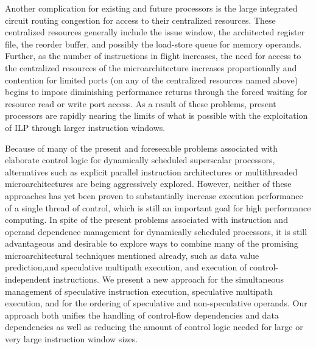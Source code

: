 \documentclass[10pt,dvips]{article}
\begin{document}
Another complication for existing and future processors is the large
integrated circuit routing congestion for 
access to their centralized resources.
These centralized resources generally include the issue window,
the architected register file, the reorder buffer, and possibly
the load-store queue for memory operands.
Further, as the number of instructions in flight increases, the need
for access to the centralized resources of the microarchitecture
increases proportionally and contention for limited ports (on any
of the centralized resources named above) begins to impose diminishing
performance returns through the forced waiting for resource 
read or write port access.
As a result of these problems, present processors
are rapidly nearing the limits of what is possible with the exploitation
of ILP through larger instruction windows.

Because of many of the present and foreseeable problems associated
with elaborate control logic for dynamically scheduled superscalar processors,
alternatives such as explicit parallel instruction architectures
or multithreaded microarchitectures are being aggressively explored.
However, neither of these approaches has yet been proven to substantially
increase
execution performance of a single thread of control, which is still
an important goal for high performance computing.
In spite of the present problems associated with instruction and operand
dependence management for dynamically scheduled processors, 
it is still advantageous and desirable
to explore ways to combine many of the promising microarchitectural
techniques mentioned already, such as data value prediction,and speculative
multipath execution, and execution of control-independent instructions.
We present a new approach for the simultaneous management of speculative
instruction execution, speculative multipath execution, and for
the ordering of speculative and non-speculative operands.
Our approach both unifies the handling of control-flow dependencies
and data dependencies as well as reducing the amount of control
logic needed for large or very large instruction window sizes.
\end{document}
